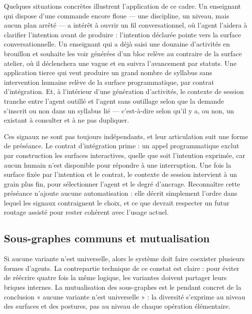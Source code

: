 Quelques situations concrètes illustrent l'application de ce cadre. Un
enseignant qui dispose d'une commande encore floue — une discipline, un
niveau, mais aucun plan arrêté — a intérêt à ouvrir un fil
conversationnel, où l'agent l'aidera à clarifier l'intention avant de
produire : l'intention déclarée pointe vers la surface
conversationnelle. Un enseignant qui a déjà saisi une douzaine
d'activités en brouillon et souhaite les voir générées d'un bloc relève
au contraire de la surface atelier, où il déclenchera une vague et en
suivra l'avancement par statuts. Une application tierce qui veut
produire un grand nombre de syllabus sans intervention humaine relève
de la surface programmatique, par contrat d'intégration. Et, à
l'intérieur d'une génération d'activités, le contexte de session
tranche entre l'agent outillé et l'agent sans outillage selon que la
demande s'inscrit ou non dans un syllabus lié — c'est-à-dire selon
qu'il y a, ou non, un existant à consulter et à ne pas dupliquer.

Ces signaux ne sont pas toujours indépendants, et leur articulation
suit une forme de préséance. Le contrat d'intégration prime : un appel
programmatique exclut par construction les surfaces interactives,
quelle que soit l'intention exprimée, car aucun humain n'est disponible
pour répondre à une interruption. Une fois la surface fixée par
l'intention et le contrat, le contexte de session intervient à un grain
plus fin, pour sélectionner l'agent et le degré d'ancrage. Reconnaître
cette préséance n'ajoute aucune automatisation : elle décrit simplement
l'ordre dans lequel les signaux contraignent le choix, et ce que
devrait respecter un futur routage assisté pour rester cohérent avec
l'usage actuel.

\subsection{Sous-graphes communs et mutualisation}
\label{sec:mutualisation}

Si aucune variante n'est universelle, alors le système doit faire
coexister plusieurs formes d'agents. La contrepartie technique de ce
constat est claire : pour éviter de réécrire quatre fois la même
logique, les variantes doivent partager leurs briques internes. La
mutualisation des sous-graphes est le pendant concret de la conclusion
« aucune variante n'est universelle » : la diversité s'exprime au
niveau des surfaces et des postures, pas au niveau de chaque opération
élémentaire.


